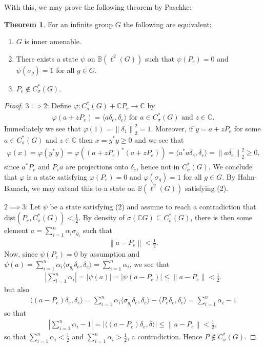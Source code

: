 \documentclass[10pt,oneside,openany,final]{memoir}
\theoremstyle{definition}
\newtheorem{theorem}{Theorem}
\theoremstyle{Break}
\newcommand{\lv}{\left\lVert}
\newcommand{\rv}{\right\rVert}
\newcommand{\C}{\mathbb{C}}
\newcommand{\B}{\mathbb{B}}
\begin{document}
With this, we may prove the following theorem by Paschke:
\begin{theorem}
	For an infinite group $G$ the following are equivalent:
	\begin{enumerate}
		\item $G$ is inner amenable.
		\item There exists a state $\psi$ on $\B(\ell^2(G))$ such that $\psi(P_e)=0$ and $\psi(\sigma_g)=1$ for all $g \in G$.
		\item $P_e \not\in C_\sigma^*(G)$.
	\end{enumerate}
\end{theorem}
\begin{proof}
$3 \implies 2$: Define $\varphi \colon C_\sigma^*(G)+\C P_e \to \C$ by
\begin{align*}
	\varphi(a+zP_e)=\langle a \delta_e,\delta_e\rangle \text{ for } a \in C_\sigma^*(G) \text{ and } z \in \C.
\end{align*}
Immediately we see that $\varphi(1)= \lv\delta_{1}\rv_2^2=1$. Moreover, if $y = a+zP_e$ for some $a \in C_\sigma^*(G)$ and $z \in \C$ then $x=y^*y\geq 0$ and we see that
\begin{align*}
	\varphi(x)=\varphi(y^*y)=\varphi\left( (a+zP_e )^*(a+z P_e) \right)= \langle a^*a \delta_e,\delta_e\rangle =  \lv a \delta_e \rv_2^2 \geq 0,
\end{align*}
since $a^*P_e$ and $P_e a$ are projections onto $\delta_e$, hence not in $C_\sigma^*(G)$. We conclude that $\varphi$ is a state satisfying $\varphi(P_e)=0$ and $\varphi(\sigma_g)=1$ for all $g \in G$. By Hahn-Banach, we may extend this to a state on $\B(\ell^2(G))$ satisfying (2).

$2 \implies 3$: Let $\psi$ be a state satisfying (2) and assume to reach a contradiction that $\mathrm{dist}(P_e,C_\sigma^*(G))<\frac{1}{2}$. By density of $\sigma(\C G) \subseteq C_\sigma^*(G)$, there is then some element $a= \sum_{i=1}^n \alpha_i \sigma_{g_i}$ such that
\begin{align*}
	\lv a - P_e \rv <\frac{1}{2}.
\end{align*}
Now, since $\psi(P_e)=0$ by assumption and $\psi(a)=\sum_{i=1}^n \alpha_i \langle \sigma_{g_i} \delta_e,\delta_e \rangle = \sum_{i=1}^{n}\alpha_i$, we see that
\begin{align*}
	\left| \sum_{i=1}^n \alpha_i \right| = |\psi(a)| = | \psi(a-P_e)|\leq \lv a-P_e\rv < \frac{1}{2}.
\end{align*}
but also
\begin{align*}
	\langle (a-P_e)\delta_e,\delta_e \rangle =\sum_{i=1}^n \alpha_i\langle \sigma_{g_i}\delta_e,\delta_e \rangle - \langle P_e \delta_e,\delta_e\rangle= \sum_{i=1}^n \alpha_i-1
\end{align*}
so that
\begin{align*}
	\left| \sum_{i=1}^{n}\alpha_i-1 \right| = |\langle(a-P_e) \delta_e,\delta \rangle| \leq \lv a-P_e\rv < \frac{1}{2},
\end{align*}
so that $\sum_{i=1}^{n}\alpha_i < \frac{1}{2}$ and $\sum_{i=1}^{n}\alpha_i > \frac{1}{2}$, a contradiction. Hence $P \not\in C_\sigma^*(G)$.


\end{proof}
\end{document}

